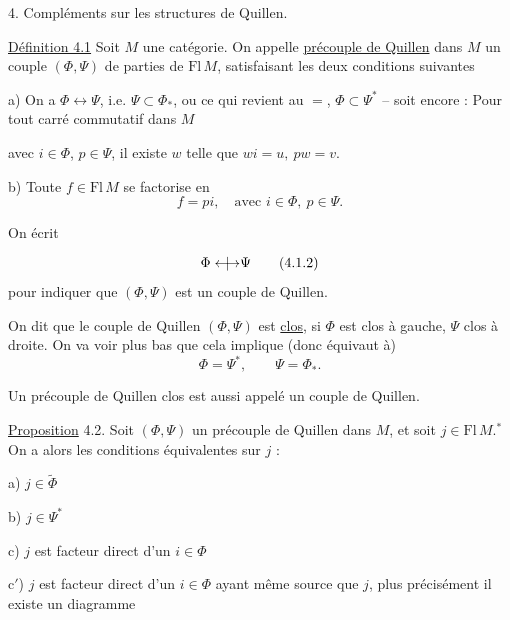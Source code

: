 4. Compléments sur les structures de Quillen.

\uline{Définition 4.1} Soit $M$ une catégorie. On appelle
\uline{précouple de Quillen} dans $M$ un couple
$(\Phi,\Psi)$ de parties de $\mathrm{Fl}\,M$, satisfaisant les
deux conditions suivantes

a) On a $\Phi\longleftrightarrow\Psi$, i.e. $\Psi\subset\Phi_*$, ou ce qui revient
au $=$, $\Phi\subset\Psi^*$  -- soit encore : Pour
tout carré commutatif dans $M$

avec $i\in\Phi$, $p\in\Psi$, il existe $w$ telle que
$wi=u,\ pw=v$.

b) Toute $f\in\mathrm{Fl}\,M$ se factorise en
\[
f=pi,\quad\text{avec }i\in\Phi,\ p\in\Psi.
\]

On écrit
\[
\Phi\mathrel{\overset{\vphantom{I}}{\longleftrightarrow}\mkern-19mu\mid\mkern9mu}\Psi
\tag*{(4.1.2)}
\]
pour indiquer que $(\Phi,\Psi)$ est un couple
de Quillen.

On  dit que le couple de Quillen $(\Phi,\Psi)$
est \uline{clos}, si $\Phi$ est clos à gauche, $\Psi$ clos à droite.
On va voir plus bas  que cela implique (donc
équivaut à)
\[
\Phi=\Psi^*,\qquad\Psi=\Phi_*.
\tag*{(4.1.3.)}
\]

Un précouple de Quillen clos est aussi appelé un
couple de Quillen.

\uline{Proposition} 4.2. Soit $(\Phi,\Psi)$ un précouple de Quillen
dans $M$, et soit $j\in\mathrm{Fl}\,M$.$^{*}$ On a alors les conditions
équivalentes sur $j$ :

a) $j\in\widetilde\Phi$

b) $j\in\Psi^*$

c) $j$ est facteur direct d'un $i\in\Phi$

c$'$) $j$ est facteur direct d'un $i\in\Phi$ ayant
même source que $j$, plus précisément il
existe un diagramme

